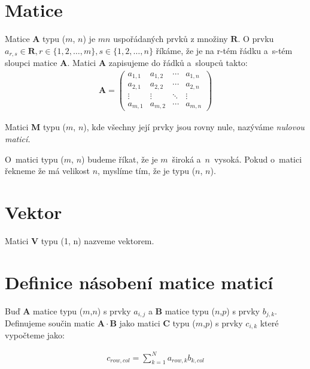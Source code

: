 


\section{Matice}

Matice \textbf{A} typu ($m$, $n$) je $m n$ uspořádaných prvků z množiny $\mathbf{R}$. O prvku $a_{r,s} \in \mathbf{R}, r \in \{1,2,\hdots,m\},s \in \{1,2,\hdots,n\}$ říkáme, že je na r-tém řádku a~s-tém sloupci matice \textbf{A}. Matici \textbf{A} zapisujeme do řádků a~sloupců takto:
\begin{align}
\mathbf{A}=\begin{pmatrix}
a_{1,1} & a_{1,2} & \cdots & a_{1,n} \\
a_{2,1} & a_{2,2} & \cdots & a_{2,n} \\
\vdots  & \vdots  & \ddots & \vdots  \\
a_{m,1} & a_{m,2} & \cdots & a_{m,n}
\end{pmatrix}
\end{align}

Matici \textbf{M} typu ($m$, $n$), kde všechny její prvky jsou rovny nule, nazýváme \textit{nulovou maticí.}

O~matici typu ($m$, $n$) budeme říkat, že je $m$~široká a~$n$~vysoká. Pokud o~matici řekneme že má velikost $n$, myslíme tím, že je typu ($n$, $n$).

\section{Vektor}

Matici \textbf{V} typu (1, n) nazveme vektorem.

\section{Definice násobení matice maticí}

Buď \textbf{A} matice typu ($m$,$n$) s prvky $a_{i,j}$ a \textbf{B} matice typu ($n$,$p$) s prvky $b_{j,k}$. Definujeme součin matic $\mathbf{A} \cdot \mathbf{B}$ jako matici \textbf{C} typu ($m$,$p$) s prvky $c_{i,k}$ které vypočteme jako:

\begin{align}
c_{row,col}=\sum_{k=1}^{N} a_{row,k} b_{k,col}
\end{align}

